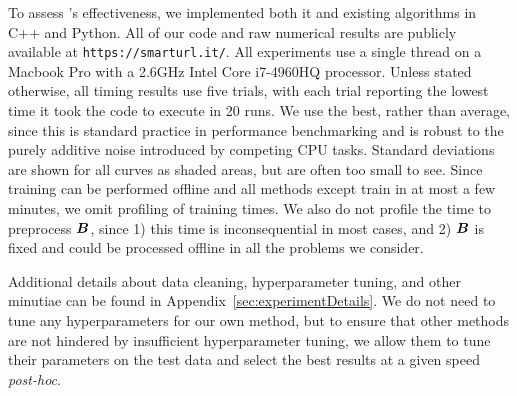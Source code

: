 
To assess \ours's effectiveness, we implemented both it and existing algorithms in C++ and Python. All of our code and raw numerical results are publicly available at \texttt{https://smarturl.it/\ours}. All experiments use a single thread on a Macbook Pro with a 2.6GHz Intel Core i7-4960HQ processor. Unless stated otherwise, all timing results use five trials, with each trial reporting the lowest time it took the code to execute in 20 runs. We use the best, rather than average, since this is standard practice in performance benchmarking and is robust to the purely additive noise introduced by competing CPU tasks. Standard deviations are shown for all curves as shaded areas, but are often too small to see. Since training can be performed offline and all methods except \cite{sparsePCA} train in at most a few minutes, we omit profiling of training times. We also do not profile the time to preprocess $\bm{B}$, since 1) this time is inconsequential in most cases, and 2) $\bm{B}$ is fixed and could be processed offline in all the problems we consider.



Additional details about data cleaning, hyperparameter tuning, and other minutiae can be found in Appendix~\ref{sec:experimentDetails}. We do not need to tune any hyperparameters for our own method, but to ensure that other methods are not hindered by insufficient hyperparameter tuning, we allow them to tune their parameters on the test data and select the best results at a given speed \textit{post-hoc}.



